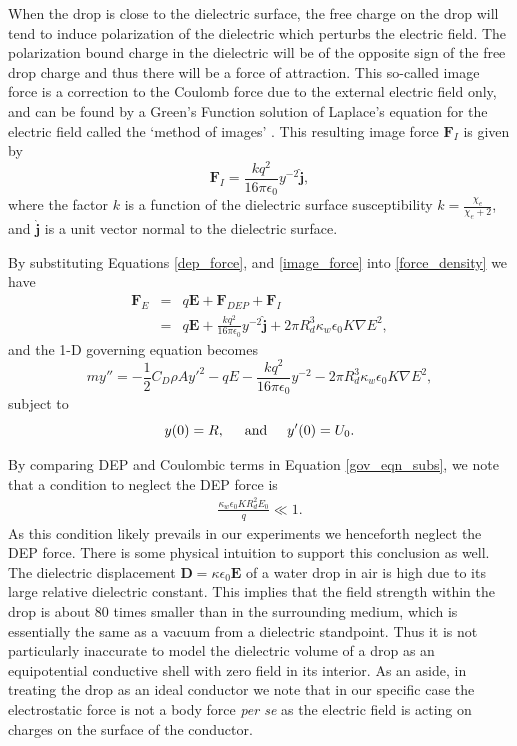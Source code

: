 \documentclass[12pt,a4paper,oneside]{book}
\begin{document}
When the drop is close to the dielectric surface, the free charge on the drop will tend to induce polarization of the dielectric which perturbs the electric field. The polarization bound charge in the dielectric will be of the opposite sign of the free drop charge and thus there will be a force of attraction. This so-called image force is a correction to the Coulomb force due to the external electric field only, and can be found by a Green's Function solution of Laplace's equation for the electric field called the `method of images' \cite{david_j._griffiths_introduction_1999}. This resulting image force $\mathbf{F}_I$ is given by
\begin{equation}
\mathbf{F}_I = \frac{k q^2}{16 \pi \epsilon_0} y^{-2} \hat{\mathbf{j}},
\label{image_force}
\end{equation}
where the factor $k$ is a function of the dielectric surface susceptibility $k = \frac{\chi_e}{\chi_e + 2}$, and $\hat{\mathbf{j}}$ is a unit vector normal to the dielectric surface.

By substituting Equations \ref{dep_force}, and \ref{image_force} into \ref{force_density} we have
\begin{eqnarray*}
 \mathbf{F}_E &=& q \mathbf{E} + \mathbf{F}_{DEP} + \mathbf{F}_I \\
 &=& q \mathbf{E} + \frac{k q^2}{16 \pi \epsilon_0 } y^{-2} \hat{\mathbf{j}} + 2 \pi R_d^3 \kappa_w \epsilon_0 K \nabla E^2, 
\end{eqnarray*}
and the 1-D governing equation becomes
\begin{equation}
 \label{gov_eqn_subs}
m y'' = - \frac{1}{2} C_D \rho A {y'}^2 - q E - \frac{k q^2}{16 \pi \epsilon_0} y^{-2}- 2 \pi R_d^3 \kappa_w \epsilon_0 K \nabla E^2,
\end{equation}
subject to
\begin{equation}
y(0) = R, \hspace{5 mm} \mbox{and} \hspace{5 mm} y'(0) = U_0 .
\end{equation}

By comparing DEP and Coulombic terms in Equation \ref{gov_eqn_subs}, we note that a condition to neglect the DEP force is
\begin{eqnarray}
\frac{ \kappa_w \epsilon_0 K R_d^2 E_0}{q} \ll 1. \nonumber
\end{eqnarray}
As this condition likely prevails in our experiments we henceforth neglect the DEP force. There is some physical intuition to support this conclusion as well. The dielectric displacement $\mathbf{D} = \kappa \epsilon_0 \mathbf{E}$ of a water drop in air is high due to its large relative dielectric constant. This implies that the field strength within the drop is about 80 times smaller than in the surrounding medium, which is essentially the same as a vacuum from a dielectric standpoint. Thus it is not particularly inaccurate to model the dielectric volume of a drop as an equipotential conductive shell with zero field in its interior. As an aside, in treating the drop as an ideal conductor we note that in our specific case the electrostatic force is not a body force \emph{per se} as the electric field is acting on charges on the surface of the conductor.
\end{document}
